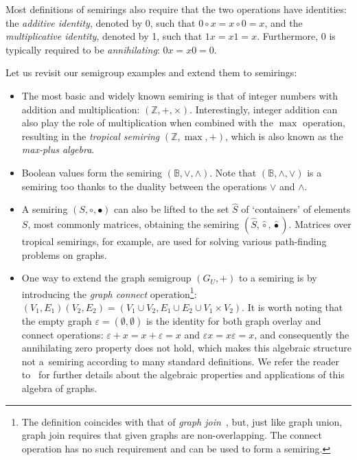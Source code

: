 \documentclass[11pt,letterpaper]{article}
\begin{document}
Most definitions of semirings also require that the two operations have
identities: the \emph{additive identity}, denoted by 0, such that
$0 \circ x = x \circ 0=x$, and the \emph{multiplicative identity}, denoted by 1,
such that $1x=x1=x$. Furthermore, 0 is typically required to be
\emph{annihilating}: $0x=x0=0$.

Let us revisit our semigroup examples and extend them to semirings:

\begin{itemize}
  \item The most basic and widely known semiring is that of integer numbers with
  addition and multiplication: $(\mathbb{Z}, +, \times)$. Interestingly, integer
  addition can also play the role of multiplication when combined with the
  $\max$ operation, resulting in the \emph{tropical semiring}
  $(\mathbb{Z}, \max, +)$, which is also known as the \emph{max-plus algebra}.

  \item Boolean values form the semiring $(\mathbb{B}, \vee, \wedge)$. Note that
  $(\mathbb{B}, \wedge, \vee)$ is a semiring too thanks to the duality between
  the operations $\vee$ and $\wedge$.

  \item A semiring $(S, \circ, \bullet)$ can also be lifted to the set $\hat{S}$
  of `containers' of elements $S$, most commonly matrices, obtaining the semiring
  $(\hat{S}, \hat{\circ}, \hat{\bullet})$. Matrices over tropical semirings, for
  example, are used for solving various path-finding problems on graphs.

  \item One way to extend the graph semigroup $(G_U,+)$ to a semiring is by
  introducing the \emph{graph connect} operation\footnote{The definition
  coincides with that of \emph{graph join}~\cite{1969_graph_theory_harary}, but,
  just like graph union, graph join requires that given graphs are
  non-overlapping. The connect operation has no such requirement and can be used
  to form a semiring.}:
  $(V_1, E_1) (V_2, E_2) = (V_1 \cup V_2, E_1 \cup E_2 \cup V_1 \times V_2)$.
  It is worth noting that the empty graph $\varepsilon = (\emptyset, \emptyset)$
  is the identity for both graph overlay and connect operations:
  $\varepsilon + x = x + \varepsilon = x$ and $\varepsilon x = x \varepsilon = x$,
  and consequently the annihilating zero property does not hold, which makes
  this algebraic structure not a~semiring according to many standard definitions.
  We refer the reader to~\cite{mokhov2017algebraic} for further details about the
  algebraic properties and applications of this algebra of graphs.
\end{itemize}
\end{document}
